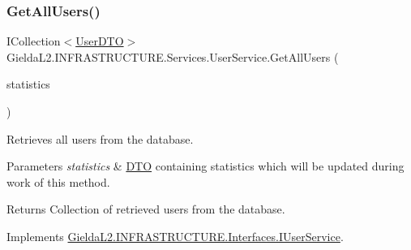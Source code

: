 \mbox{\label{class_gielda_l2_1_1_i_n_f_r_a_s_t_r_u_c_t_u_r_e_1_1_services_1_1_user_service_a448582ca4e54e603f4dd8a5a12c4bed4}} 
\subsubsection{\texorpdfstring{GetAllUsers()}{GetAllUsers()}}
{\footnotesize\ttfamily I\+Collection$<$\mbox{\hyperlink{class_gielda_l2_1_1_i_n_f_r_a_s_t_r_u_c_t_u_r_e_1_1_d_t_o_1_1_user_d_t_o}{User\+D\+TO}}$>$ Gielda\+L2.\+I\+N\+F\+R\+A\+S\+T\+R\+U\+C\+T\+U\+R\+E.\+Services.\+User\+Service.\+Get\+All\+Users (\begin{DoxyParamCaption}\item[{\mbox{\hyperlink{class_gielda_l2_1_1_i_n_f_r_a_s_t_r_u_c_t_u_r_e_1_1_d_t_o_1_1_statistics_d_t_o}{Statistics\+D\+TO}}}]{statistics }\end{DoxyParamCaption})}



Retrieves all users from the database. 


\begin{DoxyParams}{Parameters}
{\em statistics} & \mbox{\hyperlink{namespace_gielda_l2_1_1_i_n_f_r_a_s_t_r_u_c_t_u_r_e_1_1_d_t_o}{D\+TO}} containing statistics which will be updated during work of this method.\\
\hline
\end{DoxyParams}
\begin{DoxyReturn}{Returns}
Collection of retrieved users from the database.
\end{DoxyReturn}


Implements \mbox{\hyperlink{interface_gielda_l2_1_1_i_n_f_r_a_s_t_r_u_c_t_u_r_e_1_1_interfaces_1_1_i_user_service_a3eccdbcf26de6b86ae770f0e3512664e}{Gielda\+L2.\+I\+N\+F\+R\+A\+S\+T\+R\+U\+C\+T\+U\+R\+E.\+Interfaces.\+I\+User\+Service}}.

\mbox{\label{class_gielda_l2_1_1_i_n_f_r_a_s_t_r_u_c_t_u_r_e_1_1_services_1_1_user_service_a92394250a4617bc33dce562feabb6296}} 
